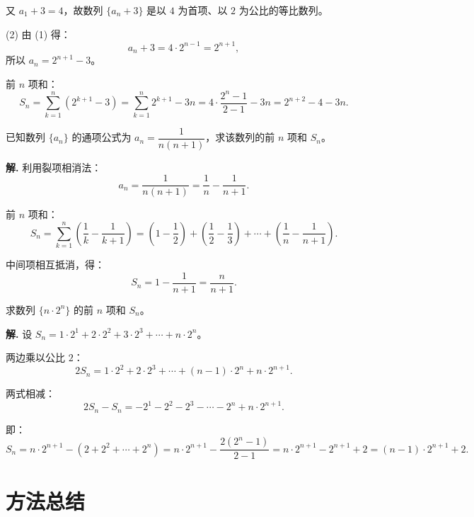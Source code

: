 \documentclass[11pt]{ctexrep}
\begin{document}
又 $a_1 + 3 = 4$，故数列 $\{a_n + 3\}$ 是以 $4$ 为首项、以 $2$ 为公比的等比数列。

(2) 由 (1) 得：
\[
    a_n + 3 = 4 \cdot 2^{n-1} = 2^{n+1},
\]
所以 $a_n = 2^{n+1} - 3$。

前 $n$ 项和：
\[
    S_n = \sum_{k=1}^{n} (2^{k+1} - 3) = \sum_{k=1}^{n} 2^{k+1} - 3n = 4 \cdot \frac{2^n - 1}{2-1} - 3n = 2^{n+2} - 4 - 3n.
\]

\begin{example}[裂项相消法求和]
    已知数列 $\{a_n\}$ 的通项公式为 $a_n = \dfrac{1}{n(n+1)}$，求该数列的前 $n$ 项和 $S_n$。
\end{example}

\textbf{解.} 利用裂项相消法：
\[
    a_n = \frac{1}{n(n+1)} = \frac{1}{n} - \frac{1}{n+1}.
\]

前 $n$ 项和：
\[
    S_n = \sum_{k=1}^{n} \left(\frac{1}{k} - \frac{1}{k+1}\right) = \left(1 - \frac{1}{2}\right) + \left(\frac{1}{2} - \frac{1}{3}\right) + \cdots + \left(\frac{1}{n} - \frac{1}{n+1}\right).
\]

中间项相互抵消，得：
\[
    S_n = 1 - \frac{1}{n+1} = \frac{n}{n+1}.
\]

\begin{example}[错位相减法求和]
    求数列 $\{n \cdot 2^n\}$ 的前 $n$ 项和 $S_n$。
\end{example}

\textbf{解.} 设 $S_n = 1 \cdot 2^1 + 2 \cdot 2^2 + 3 \cdot 2^3 + \cdots + n \cdot 2^n$。

两边乘以公比 $2$：
\[
    2S_n = 1 \cdot 2^2 + 2 \cdot 2^3 + \cdots + (n-1) \cdot 2^n + n \cdot 2^{n+1}.
\]

两式相减：
\[
    2S_n - S_n = -2^1 - 2^2 - 2^3 - \cdots - 2^n + n \cdot 2^{n+1}.
\]

即：
\[
    S_n = n \cdot 2^{n+1} - (2 + 2^2 + \cdots + 2^n) = n \cdot 2^{n+1} - \frac{2(2^n - 1)}{2-1} = n \cdot 2^{n+1} - 2^{n+1} + 2 = (n-1) \cdot 2^{n+1} + 2.
\]

\section*{方法总结}
\end{document}
